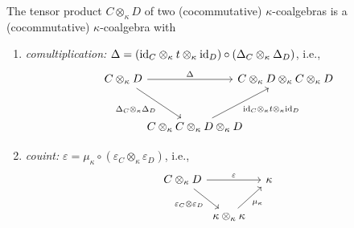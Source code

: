 \begin{thm}\label{thm:tensor-coalgebra}
    The tensor product\/ $C\otimes_\kappa D$ of two (cocommutative)\/ $\kappa$-coalgebras is a (cocommutative)\/ $\kappa$-coalgebra with
    \begin{enumerate}[-]
        \item \textit{comultiplication:} $\Delta
            =(\text{\rm id}_C\otimes_\kappa t\otimes_\kappa\text{\rm id}_D)\circ(\Delta_C\otimes_\kappa\Delta_D)$,
        i.e.,
        $$
            \begin{tikzcd}[row sep=large]
                &[-1cm]&[-1.3cm]\\[-2.5cm]
                C\otimes_\kappa D
                        \arrow[rd,"\Delta_C\otimes_\kappa\Delta_D"']
                        \arrow[rr,"\Delta"]
                    &&C\otimes_\kappa D\otimes_\kappa C\otimes_\kappa D\\
                    &C\otimes_\kappa C\otimes_\kappa D\otimes_\kappa D
                        \arrow[ru,"\id_C\otimes_\kappa t\otimes_\kappa\id_D"']
            \end{tikzcd}
        $$
        \normalsize
        \item\textit{couint:} $\varepsilon
            =\mu_\kappa\circ(\varepsilon_C\otimes_\kappa\varepsilon_D)$,
        i.e.,
        $$
        \begin{tikzcd}
            &[-0.8cm]&[-0.5cm]\\[-3.cm]
            C\otimes_\kappa D
                    \arrow[rr,"\varepsilon"]
                    \arrow[rd,"\varepsilon_C\otimes\varepsilon_D"']
                &&\kappa\\
                &\kappa\otimes_\kappa\kappa
                    \arrow[ru,"\mu_\kappa"']
        \end{tikzcd}
        $$
        \normalsize
    \end{enumerate}
\end{thm}

